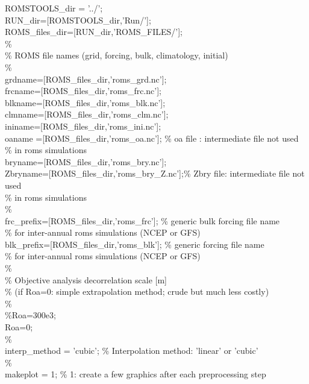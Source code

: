 ROMSTOOLS\_dir = '../';\\
RUN\_dir=[ROMSTOOLS\_dir,'Run/'];\\
ROMS\_files\_dir=[RUN\_dir,'ROMS\_FILES/'];\\
\%\\
\% ROMS file names (grid, forcing, bulk, climatology, initial)\\
\%\\
grdname=[ROMS\_files\_dir,'roms\_grd.nc'];\\
frcname=[ROMS\_files\_dir,'roms\_frc.nc'];\\
blkname=[ROMS\_files\_dir,'roms\_blk.nc'];\\
clmname=[ROMS\_files\_dir,'roms\_clm.nc'];\\
ininame=[ROMS\_files\_dir,'roms\_ini.nc'];\\
oaname =[ROMS\_files\_dir,'roms\_oa.nc'];    \% oa file  : intermediate file not used\\
                                          \%            in roms simulations\\
bryname=[ROMS\_files\_dir,'roms\_bry.nc'];\\
Zbryname=[ROMS\_files\_dir,'roms\_bry\_Z.nc'];\% Zbry file: intermediate file not used\\
                                          \%            in roms simulations\\
\%\\
frc\_prefix=[ROMS\_files\_dir,'roms\_frc'];   \% generic bulk forcing file name \\
                                          \% for inter-annual roms simulations (NCEP or GFS)\\
blk\_prefix=[ROMS\_files\_dir,'roms\_blk'];   \% generic forcing file name\\
                                          \% for inter-annual roms simulations (NCEP or GFS)\\
\%\\
\% Objective analysis decorrelation scale [m]\\
\% (if Roa=0: simple extrapolation method; crude but much less costly)\\
\%\\
\%Roa=300e3;\\
Roa=0;\\
\%\\
interp\_method = 'cubic';           \% Interpolation method: 'linear' or 'cubic'\\
\%\\
makeplot     = 1;                 \% 1: create a few graphics after each preprocessing step\\
